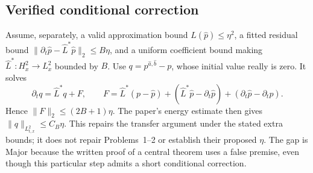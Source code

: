 \documentclass[10pt]{article}
\begin{document}
\subsection*{Verified conditional correction}
Assume, separately, a valid approximation bound \(L(\widehat p)\le\eta^2\), a fitted residual bound \(\|\partial_t\widehat p-\widehat L^*\widehat
p\|_2\le B\eta\), and a uniform coefficient bound making \(\widehat L^*:H^2_x\to L^2_x\) bounded by \(B\). Use \(q=p^{\widehat a,\widehat b}-p\), whose initial value really is zero. It solves \[\partial_tq=\widehat L^*q+F,\qquad
 F=\widehat L^*(p-\widehat p)
   +(\widehat L^*\widehat p-\partial_t\widehat p)
   +(\partial_t\widehat p-\partial_t p).\] Hence \(\|F\|_2\le(2B+1)\eta\). The paper’s energy estimate then gives \(\|q\|_{L^2_{t,x}}\le C_B\eta\). This repairs the transfer argument under the stated extra bounds; it does not repair Problems 1–2 or establish their proposed \(\eta\). The gap is Major because the written proof of a central theorem uses a false premise, even though this particular step admits a short conditional correction.\par
\end{document}
